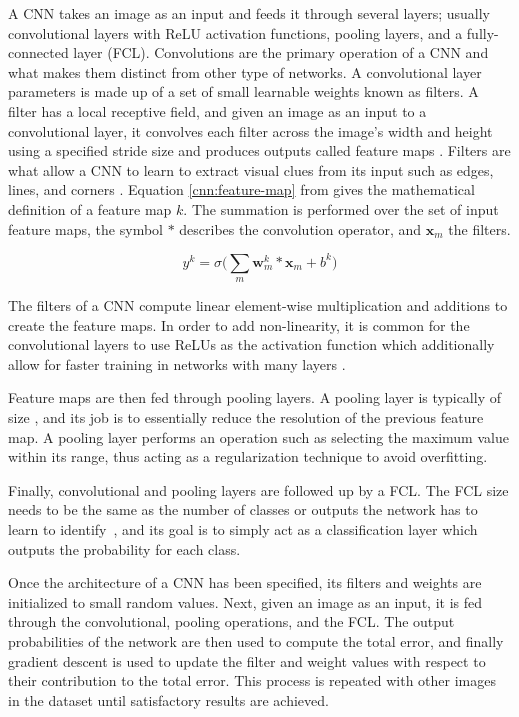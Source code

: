 A CNN takes an image as an input and feeds it through several layers; usually convolutional layers with ReLU activation functions, pooling layers, and a fully-connected layer (FCL). Convolutions are the primary operation of a CNN and what makes them distinct from other type of networks. A convolutional layer parameters is made up of a set of small learnable weights known as filters. A filter has a local receptive field, and given an image as an input to a convolutional layer, it convolves each filter across the image's width and height using a specified stride size and produces outputs called feature maps \cite{cnn-star-galaxy}. Filters are what allow a CNN to learn to extract visual clues from its input such as edges, lines, and corners \cite{Lecun99objectrecognition}. Equation \ref{cnn:feature-map} from \cite{cnn-star-galaxy} gives the mathematical definition of a feature map $k$. The summation is performed over the set of input feature maps, the symbol $*$ describes the convolution operator, and $\boldsymbol{x}_m$ the filters.

\begin{equation} \label{cnn:feature-map}
y^k = \sigma{\bigg(\sum_{m} \boldsymbol{w}^{k}_{m} * \boldsymbol{x}_m + b^k \bigg)}
\end{equation}

The filters of a CNN compute linear element-wise multiplication and additions to create the feature maps. In order to add non-linearity, it is common for the convolutional layers to use ReLUs as the activation function which additionally allow for faster training in networks with many layers \cite{cnn-star-galaxy}.

Feature maps are then fed through pooling layers. A pooling layer is typically of size  \cite{alexnet-paper}, and its job is to essentially reduce the resolution of the previous feature map. A pooling layer performs an operation such as selecting the maximum value within its range, thus acting as a regularization technique to avoid overfitting.

Finally, convolutional and pooling layers are followed up by a FCL. The FCL size needs to be the same as the number of classes or outputs the network has to learn to identify~\cite{Ciresan11flexible}, and its goal is to simply act as a classification layer which outputs the probability for each class.

Once the architecture of a CNN has been specified, its filters and weights are initialized to small random values. Next, given an image as an input, it is fed through the convolutional, pooling operations, and the FCL. The output probabilities of the network are then used to compute the total error, and finally gradient descent is used to update the filter and weight values with respect to their contribution to the total error. This process is repeated with other images in the dataset until satisfactory results are achieved.
